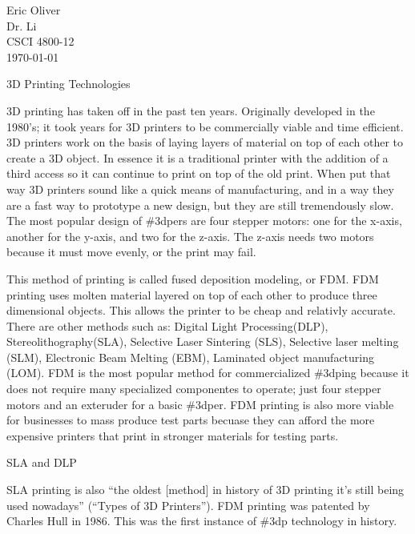 \documentclass[12pt]{article}
\begin{document}
\begin{flushleft}

Eric Oliver \\
Dr. Li \\
CSCI 4800-12 \\
\today

\begin{center}
\large 3D Printing Technologies
\end{center}

\setlength{\parindent}{0.5in}



3D printing has taken off in the past ten years. Originally developed in the 1980's; it took years for 3D printers to be commercially viable and time efficient. 3D printers work on the basis of laying layers of material on top of each other to create a 3D object. In essence it is a traditional printer with the addition of a third access so it can continue to print on top of the old print. When put that way 3D printers sound like a quick means of manufacturing, and in a way they are a fast way to prototype a new design, but they are still tremendously slow. The most popular design of \#3dpers are four stepper motors: one for the x-axis, another for the y-axis, and two for the z-axis. The z-axis needs two motors because it must move evenly, or the print may fail. 

This method of printing is called fused deposition modeling, or FDM. FDM printing uses molten material layered on top of each other to produce three dimensional objects. This allows the printer to be cheap and relativly accurate. There are other methods such as: Digital Light Processing(DLP), Stereolithography(SLA), Selective Laser Sintering (SLS), Selective laser melting (SLM), Electronic Beam Melting (EBM), Laminated object manufacturing (LOM). FDM is the most popular method for commercialized \#3dping because it does not require many specialized componentes to operate; just four stepper motors and an exteruder for a basic \#3dper. FDM printing is also more viable for businesses to mass produce test parts becuase they can afford the more expensive printers that print in stronger materials for testing parts.

SLA and DLP 

SLA printing is also ``the oldest [method] in history of 3D printing it’s still being used nowadays'' (``Types of 3D Printers''). FDM printing was patented by Charles Hull in 1986. This was the first instance of \#3dp technology in history.


\end{flushleft}
\end{document}
